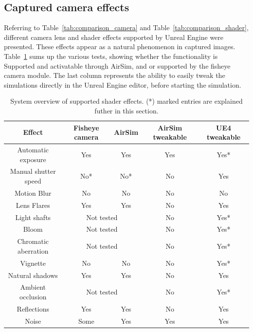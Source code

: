 \subsection{Captured camera effects}

Referring to Table~\ref{tab:comparison_camera} and Table~\ref{tab:comparison_shader}, different camera lens and shader effects supported by Unreal Engine were presented. These effects appear as a natural phenomenon in captured images. Table~\ref{tab:res_shader_effects} sums up the various tests, showing whether the functionality is Supported and activatable through AirSim, and or supported by the fisheye camera module. The last column represents the ability to easily tweak the simulations directly in the Unreal Engine editor, before starting the simulation.

\begin{table}[!htb]
    \centering
    \caption{System overview of supported shader effects. (*) marked entries are explained futher in this section.}
    \label{tab:res_shader_effects}
    \begin{tabular}{|c|c|c|c|c|} \hline
        \textbf{Effect} & Fisheye camera & AirSim & AirSim tweakable & UE4 tweakable \\ \hline \hline
        Automatic exposure & Yes & Yes & Yes & Yes* \\ \hline                 
        Manual shutter speed & No* & No* & No & Yes \\ \hline
        Motion Blur & No & No & No & No \\ \hline
        Lens Flares & Yes & Yes & No & Yes \\ \hline
        Light shafts & \multicolumn{2}{c|}{Not tested} & No & Yes* \\ \hline
        Bloom & \multicolumn{2}{c|}{Not tested} & No & Yes* \\ \hline
        Chromatic aberration & \multicolumn{2}{c|}{Not tested} & No & Yes* \\ \hline
        Vignette & No & No & No & Yes* \\ \hline
        Natural shadows & Yes & Yes & No & Yes \\ \hline
        Ambient occlusion & \multicolumn{2}{c|}{Not tested} & No & Yes* \\ \hline
        Reflections & Yes & Yes & No & Yes \\ \hline
        Noise & Some & Yes & Yes & Yes \\ \hline
        
    \end{tabular}
\end{table}

